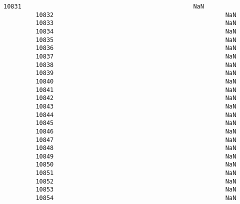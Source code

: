 \documentclass[11pt]{article}
\begin{document}
\begin{Verbatim}[commandchars=\\\{\}]
         10831                                                NaN   
         10832                                                NaN   
         10833                                                NaN   
         10834                                                NaN   
         10835                                                NaN   
         10836                                                NaN   
         10837                                                NaN   
         10838                                                NaN   
         10839                                                NaN   
         10840                                                NaN   
         10841                                                NaN   
         10842                                                NaN   
         10843                                                NaN   
         10844                                                NaN   
         10845                                                NaN   
         10846                                                NaN   
         10847                                                NaN   
         10848                                                NaN   
         10849                                                NaN   
         10850                                                NaN   
         10851                                                NaN   
         10852                                                NaN   
         10853                                                NaN   
         10854                                                NaN   
         

\end{Verbatim}
\end{document}
